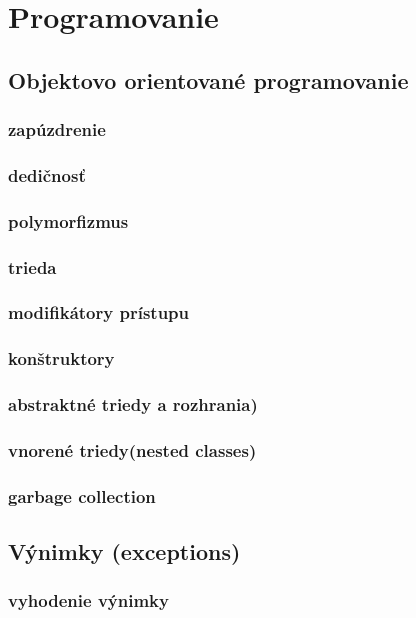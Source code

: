 \chapter[Programovanie]{Programovanie}
\label{programovanie} %

\section{Objektovo orientované programovanie}
\subsection*{zapúzdrenie}
\subsection*{dedičnosť}
\subsection*{polymorfizmus}
\subsection*{trieda}
\subsection*{modifikátory prístupu}
\subsection*{konštruktory}
\subsection*{abstraktné triedy a rozhrania)}
\subsection*{vnorené triedy(nested classes)}
\subsection*{garbage collection}

\section{Výnimky (exceptions)}
\subsection*{vyhodenie výnimky}
